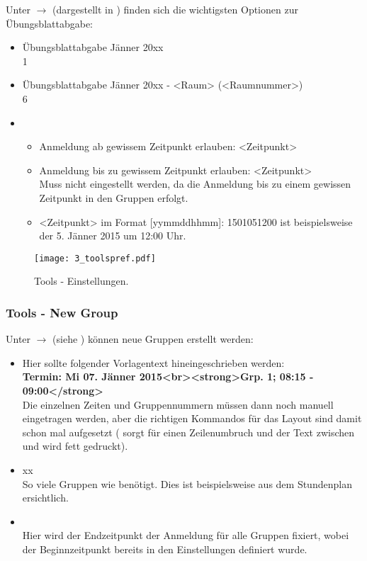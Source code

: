 Unter  $\to$  
(dargestellt in ) finden sich die wichtigsten Optionen zur
Übungsblattabgabe:
\begin{itemize}
\item {} Übungsblattabgabe Jänner 20xx\\
   1
\item {} Übungsblattabgabe Jänner 20xx - <Raum> (<Raumnummer>)\\
   6
\item {}
  \begin{itemize}
    \item  Anmeldung ab gewissem Zeitpunkt erlauben: 
       <Zeitpunkt>
    \item  Anmeldung bis zu gewissem Zeitpunkt erlauben: 
       <Zeitpunkt>\\
      Muss nicht eingestellt werden, da die Anmeldung bis zu einem gewissen
      Zeitpunkt in den Gruppen erfolgt.
    \item <Zeitpunkt> im Format [yymmddhhmm]: 1501051200 ist beispielsweise
      der 5. Jänner 2015 um 12:00 Uhr.
  \end{itemize}
\end{itemize}

\begin{figure}[htbp]
  \begin{center}
  \texttt{[image: 3\_toolspref.pdf]}
  \caption{ Tools - Einstellungen.}
  \label{fig:toolspref}
  \end{center}
\end{figure}

\subsubsection{Tools - New Group}

Unter  $\to$  
(siehe ) können neue Gruppen erstellt werden:
\begin{itemize}
\item {} 
  Hier sollte folgender Vorlagentext hineingeschrieben werden:\\
  {\bf Termin: Mi 07. Jänner 2015<br><strong>Grp. 1; 08:15 - 09:00</strong>}\\
  Die einzelnen Zeiten und Gruppennummern müssen dann noch manuell eingetragen
  werden, aber die richtigen Kommandos für das Layout sind damit schon mal
  aufgesetzt ( sorgt für einen Zeilenumbruch und der Text
  zwischen  und  wird fett 
  gedruckt).
\item {} xx\\
  So viele Gruppen wie benötigt. Dies ist beispielsweise aus dem Stundenplan 
  ersichtlich.
\item {}\\
  Hier wird der Endzeitpunkt der Anmeldung für alle Gruppen fixiert, wobei der
  Beginnzeitpunkt bereits in den Einstellungen definiert wurde.  
\end{itemize}

